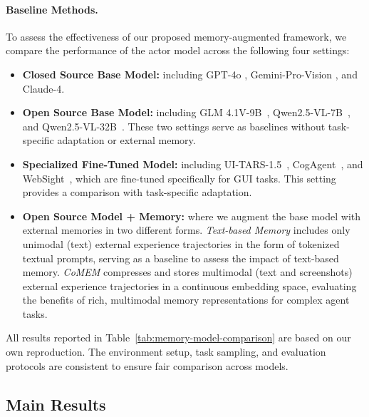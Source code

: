 \documentclass{article} %
\begin{document}
\paragraph{Baseline Methods.}
To assess the effectiveness of our proposed memory-augmented framework, we compare the performance of the actor model across the following four settings:

\begin{itemize}
    \item[(i)] \textbf{Closed Source Base Model:} including GPT-4o \citep{openai2024gpt4ocard}, Gemini-Pro-Vision \citep{team2023gemini}, and Claude-4\citep{anthropic2024claude4}.
    
    \item[(ii)] \textbf{Open Source Base Model:} including GLM 4.1V-9B~\citep{GLM}, Qwen2.5-VL-7B~\citep{wang2024qwen2}, and Qwen2.5-VL-32B~\citep{yang2024qwen2.5}. These two settings serve as baselines without task-specific adaptation or external memory.
    
    \item[(iii)] \textbf{Specialized Fine-Tuned Model:} including UI-TARS-1.5~\citep{uitars}, CogAgent~\citep{hong2023cogagent}, and WebSight~\citep{bhathal2025websight}, which are fine-tuned specifically for GUI tasks. This setting provides a comparison with task-specific adaptation.
    
    \item[(iv)] \textbf{Open Source Model + Memory:} where we augment the base model with external memories in two different forms. \textit{Text-based Memory} includes only unimodal (text) external experience trajectories in the form of tokenized textual prompts, serving as a baseline to assess the impact of text-based memory. \textit{CoMEM} compresses and stores multimodal (text and screenshots) external experience trajectories in a continuous embedding space, evaluating the benefits of rich, multimodal memory representations for complex agent tasks.
\end{itemize}

All results reported in Table~\ref{tab:memory-model-comparison} are based on our own reproduction. The environment setup, task sampling, and evaluation protocols are consistent to ensure fair comparison across models.

\subsection{Main Results}
\end{document}
